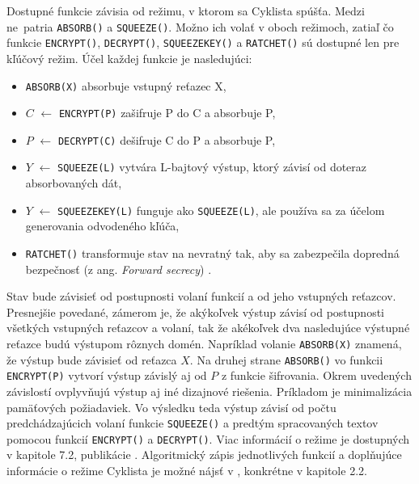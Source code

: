 Dostupné funkcie závisia od režimu, v ktorom sa  Cyklista spúšťa. Medzi ne~patria \lstinline|ABSORB()| a \lstinline|SQUEEZE()|. Možno ich volať v oboch režimoch, zatiaľ čo funkcie \lstinline|ENCRYPT()|, \lstinline|DECRYPT()|, \lstinline|SQUEEZEKEY()| a \lstinline|RATCHET()| sú dostupné len pre kľúčový režim. Účel každej funkcie je nasledujúci:
\begin{itemize}
	\item \lstinline|ABSORB(X)| absorbuje vstupný reťazec X,
	\item $C$ $\gets$ \lstinline|ENCRYPT(P)| zašifruje P do C a absorbuje P,
	\item $P$ $\gets$ \lstinline|DECRYPT(C)| dešifruje C do P a absorbuje P,
	\item $Y$ $\gets$	\lstinline|SQUEEZE(L)|  vytvára L-bajtový výstup, ktorý závisí od doteraz absorbovaných dát,
	\item $Y$ $\gets$	\lstinline|SQUEEZEKEY(L)| funguje ako \lstinline|SQUEEZE(L)|, ale používa sa za účelom generovania odvodeného kľúča,
	\item \lstinline|RATCHET()| transformuje stav na nevratný tak, aby sa zabezpečila dopredná bezpečnosť (z ang. \textit{Forward secrecy}) \cite{fsec}. 
\end{itemize}

Stav bude závisieť od postupnosti volaní funkcií a od jeho vstupných reťazcov. Presnejšie povedané, zámerom je, že akýkoľvek výstup závisí od postupnosti všetkých vstupných reťazcov a volaní, tak že akékoľvek dva nasledujúce výstupné reťazce budú výstupom rôznych domén. Napríklad volanie \lstinline|ABSORB(X)| znamená, že výstup bude závisieť od reťazca $X$. Na druhej strane \lstinline|ABSORB()| vo funkcii \lstinline|ENCRYPT(P)| vytvorí výstup závislý aj od $P$ z funkcie šifrovania. Okrem uvedených závislostí ovplyvňujú výstup aj iné dizajnové riešenia. Príkladom je minimalizácia pamäťových požiadaviek. Vo výsledku teda výstup závisí od počtu predchádzajúcich volaní funkcie \lstinline|SQUEEZE()| a predtým spracovaných textov pomocou funkcií \lstinline|ENCRYPT()| a \lstinline|DECRYPT()|. Viac informácií o režime je dostupných v kapitole 7.2, publikácie \cite{xcb}.
Algoritmický zápis jednotlivých funkcií a doplňujúce informácie o režime Cyklista je možné nájsť v \cite{xdr2}, konkrétne v kapitole 2.2. 

